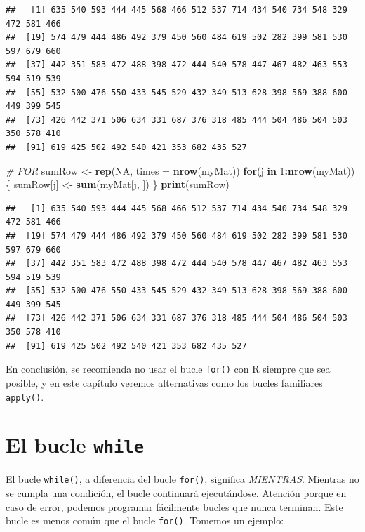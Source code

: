 \documentclass[
]{book}
\newenvironment{Shaded}{\begin{snugshade}}{\end{snugshade}}
\newcommand{\CommentTok}[1]{\textcolor[rgb]{0.56,0.35,0.01}{\textit{#1}}}
\newcommand{\ControlFlowTok}[1]{\textcolor[rgb]{0.13,0.29,0.53}{\textbf{#1}}}
\newcommand{\DataTypeTok}[1]{\textcolor[rgb]{0.13,0.29,0.53}{#1}}
\newcommand{\DecValTok}[1]{\textcolor[rgb]{0.00,0.00,0.81}{#1}}
\newcommand{\KeywordTok}[1]{\textcolor[rgb]{0.13,0.29,0.53}{\textbf{#1}}}
\newcommand{\NormalTok}[1]{#1}
\newcommand{\OperatorTok}[1]{\textcolor[rgb]{0.81,0.36,0.00}{\textbf{#1}}}
\newcommand{\OtherTok}[1]{\textcolor[rgb]{0.56,0.35,0.01}{#1}}
\newcommand{\StringTok}[1]{\textcolor[rgb]{0.31,0.60,0.02}{#1}}
\begin{document}
\begin{verbatim}
##   [1] 635 540 593 444 445 568 466 512 537 714 434 540 734 548 329 472 581 466
##  [19] 574 479 444 486 492 379 450 560 484 619 502 282 399 581 530 597 679 660
##  [37] 442 351 583 472 488 398 472 444 540 578 447 467 482 463 553 594 519 539
##  [55] 532 500 476 550 433 545 529 432 349 513 628 398 569 388 600 449 399 545
##  [73] 426 442 371 506 634 331 687 376 318 485 444 504 486 504 503 350 578 410
##  [91] 619 425 502 492 540 421 353 682 435 527
\end{verbatim}

\begin{Shaded}
\begin{Highlighting}[]
\CommentTok{# FOR}
\NormalTok{sumRow <-}\StringTok{ }\KeywordTok{rep}\NormalTok{(}\OtherTok{NA}\NormalTok{, }\DataTypeTok{times =} \KeywordTok{nrow}\NormalTok{(myMat))}
\ControlFlowTok{for}\NormalTok{(j }\ControlFlowTok{in} \DecValTok{1}\OperatorTok{:}\KeywordTok{nrow}\NormalTok{(myMat))\{}
\NormalTok{  sumRow[j] <-}\StringTok{ }\KeywordTok{sum}\NormalTok{(myMat[j, ])}
\NormalTok{\}}
\KeywordTok{print}\NormalTok{(sumRow)}
\end{Highlighting}
\end{Shaded}

\begin{verbatim}
##   [1] 635 540 593 444 445 568 466 512 537 714 434 540 734 548 329 472 581 466
##  [19] 574 479 444 486 492 379 450 560 484 619 502 282 399 581 530 597 679 660
##  [37] 442 351 583 472 488 398 472 444 540 578 447 467 482 463 553 594 519 539
##  [55] 532 500 476 550 433 545 529 432 349 513 628 398 569 388 600 449 399 545
##  [73] 426 442 371 506 634 331 687 376 318 485 444 504 486 504 503 350 578 410
##  [91] 619 425 502 492 540 421 353 682 435 527
\end{verbatim}

En conclusión, se recomienda no usar el bucle \texttt{for()} con R siempre que sea posible, y en este capítulo veremos alternativas como los bucles familiares \texttt{apply()}.

\hypertarget{l17while}{%
\section{\texorpdfstring{El bucle \texttt{while}}{El bucle while}}\label{l17while}}

El bucle \texttt{while()}, a diferencia del bucle \texttt{for()}, significa \emph{MIENTRAS}. Mientras no se cumpla una condición, el bucle continuará ejecutándose. Atención porque en caso de error, podemos programar fácilmente bucles que nunca terminan. Este bucle es menos común que el bucle \texttt{for()}. Tomemos un ejemplo:
\end{document}
